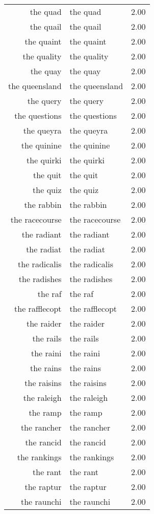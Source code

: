 \begin{table}[ht]
\begin{tabular}{rlr}
  the quad & the quad & 2.00 \\ 
  the quail & the quail & 2.00 \\ 
  the quaint & the quaint & 2.00 \\ 
  the quality & the quality & 2.00 \\ 
  the quay & the quay & 2.00 \\ 
  the queensland & the queensland & 2.00 \\ 
  the query & the query & 2.00 \\ 
  the questions & the questions & 2.00 \\ 
  the queyra & the queyra & 2.00 \\ 
  the quinine & the quinine & 2.00 \\ 
  the quirki & the quirki & 2.00 \\ 
  the quit & the quit & 2.00 \\ 
  the quiz & the quiz & 2.00 \\ 
  the rabbin & the rabbin & 2.00 \\ 
  the racecourse & the racecourse & 2.00 \\ 
  the radiant & the radiant & 2.00 \\ 
  the radiat & the radiat & 2.00 \\ 
  the radicalis & the radicalis & 2.00 \\ 
  the radishes & the radishes & 2.00 \\ 
  the raf & the raf & 2.00 \\ 
  the rafflecopt & the rafflecopt & 2.00 \\ 
  the raider & the raider & 2.00 \\ 
  the rails & the rails & 2.00 \\ 
  the raini & the raini & 2.00 \\ 
  the rains & the rains & 2.00 \\ 
  the raisins & the raisins & 2.00 \\ 
  the raleigh & the raleigh & 2.00 \\ 
  the ramp & the ramp & 2.00 \\ 
  the rancher & the rancher & 2.00 \\ 
  the rancid & the rancid & 2.00 \\ 
  the rankings & the rankings & 2.00 \\ 
  the rant & the rant & 2.00 \\ 
  the raptur & the raptur & 2.00 \\ 
  the raunchi & the raunchi & 2.00 \\ 

\end{tabular}
\end{table}
